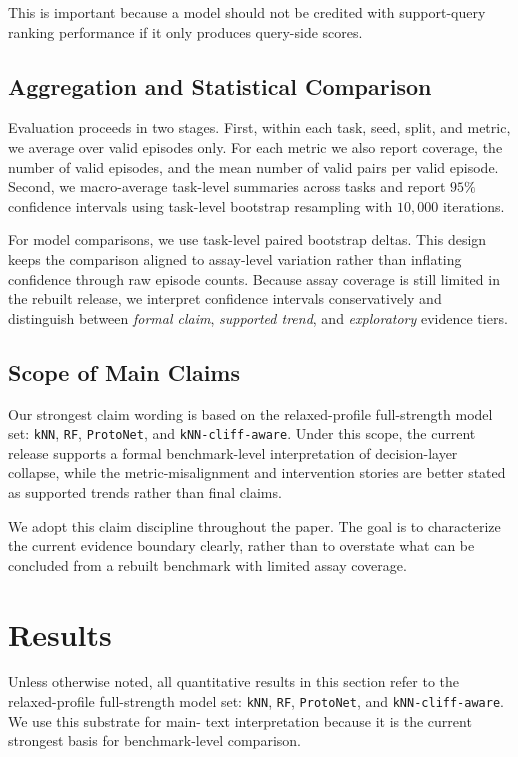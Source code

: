 \documentclass{article}
\begin{document}
This is important because a model should not be credited with support-query ranking performance if it only
produces query-side scores.

\subsection{Aggregation and Statistical Comparison}

Evaluation proceeds in two stages. First, within each task, seed, split, and metric, we average over valid
episodes only. For each metric we also report coverage, the number of valid episodes, and the mean number of valid
pairs per valid episode. Second, we macro-average task-level summaries across tasks and report $95\%$ confidence
intervals using task-level bootstrap resampling with $10{,}000$ iterations.

For model comparisons, we use task-level paired bootstrap deltas. This design keeps the comparison aligned to
assay-level variation rather than inflating confidence through raw episode counts. Because assay coverage is still
limited in the rebuilt release, we interpret confidence intervals conservatively and distinguish between
\emph{formal claim}, \emph{supported trend}, and \emph{exploratory} evidence tiers.

\subsection{Scope of Main Claims}

Our strongest claim wording is based on the relaxed-profile full-strength model set: \texttt{kNN}, \texttt{RF},
\texttt{ProtoNet}, and \texttt{kNN-cliff-aware}. Under this scope, the current release supports a formal
benchmark-level interpretation of decision-layer collapse, while the metric-misalignment and intervention stories
are better stated as supported trends rather than final claims.

We adopt this claim discipline throughout the paper. The goal is to characterize the current evidence boundary
clearly, rather than to overstate what can be concluded from a rebuilt benchmark with limited assay coverage.

\section{Results}

Unless otherwise noted, all quantitative results in this section refer to the relaxed-profile full-strength model
set: \texttt{kNN}, \texttt{RF}, \texttt{ProtoNet}, and \texttt{kNN-cliff-aware}. We use this substrate for main-
text interpretation because it is the current strongest basis for benchmark-level comparison.
\end{document}
